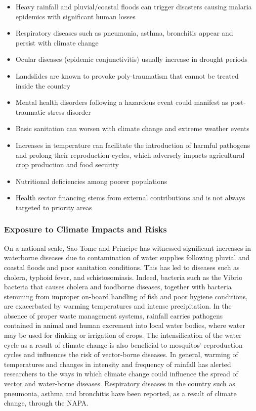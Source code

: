 \documentclass[
]{book}
\providecommand{\tightlist}{%
  \setlength{\itemsep}{0pt}\setlength{\parskip}{0pt}}
\begin{document}
\begin{itemize}
\tightlist
\item
  Heavy rainfall and pluvial/coastal floods can trigger disasters causing malaria epidemics with significant human losses
\item
  Respiratory diseases such as pneumonia, asthma, bronchitis appear and persist with climate change
\item
  Ocular diseases (epidemic conjunctivitis) usually increase in drought periods
\item
  Landslides are known to provoke poly-traumatism that cannot be treated inside the country
\item
  Mental health disorders following a hazardous event could manifest as post-traumatic stress disorder
\item
  Basic sanitation can worsen with climate change and extreme weather events
\item
  Increases in temperature can facilitate the introduction of harmful pathogens and prolong their reproduction cycles, which adversely impacts agricultural crop production and food security
\item
  Nutritional deficiencies among poorer populations
\item
  Health sector financing stems from external contributions and is not always targeted to priority areas
\end{itemize}

\hypertarget{exposure-to-climate-impacts-and-risks-7}{%
\subsubsection{Exposure to Climate Impacts and Risks}\label{exposure-to-climate-impacts-and-risks-7}}

On a national scale, Sao Tome and Principe has witnessed significant increases in waterborne diseases due to contamination of water supplies following pluvial and coastal floods and poor sanitation conditions. This has led to diseases such as cholera, typhoid fever, and schistosomiasis. Indeed, bacteria such as the Vibrio bacteria that causes cholera and foodborne diseases, together with bacteria stemming from improper on-board handling of fish and poor hygiene conditions, are exacerbated by warming temperatures and intense precipitation. In the absence of proper waste management systems, rainfall carries pathogens contained in animal and human excrement into local water bodies, where water may be used for dinking or irrigation of crops. The intensification of the water cycle as a result of climate change is also beneficial to mosquitos' reproduction cycles and influences the risk of vector-borne diseases. In general, warming of temperatures and changes in intensity and frequency of rainfall has alerted researchers to the ways in which climate change could influence the spread of vector and water-borne diseases. Respiratory diseases in the country such as pneumonia, asthma and bronchitis have been reported, as a result of climate change, through the NAPA.
\end{document}
